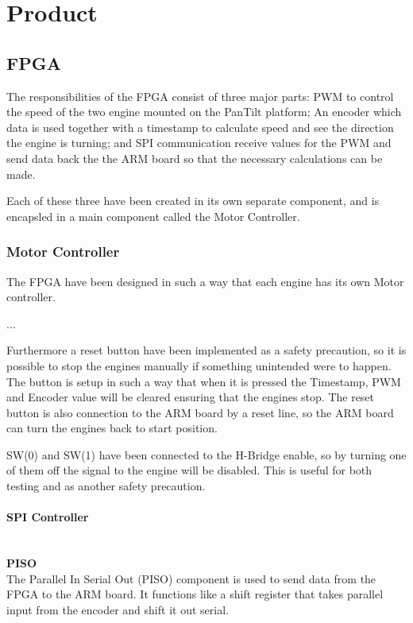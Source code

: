 \section{Product}

\subsection{FPGA}
The responsibilities of the FPGA consist of three major parts: PWM to control the speed of the two engine mounted on the PanTilt platform; An encoder which data is used together with a timestamp to calculate speed and see the direction the engine is turning; and SPI communication receive values for the PWM and send data back the the ARM board so that the necessary calculations can be made.

Each of these three have been created in its own separate component, and is encapsled in a main component called the Motor Controller.


\subsubsection{Motor Controller}

The FPGA have been designed in such a way that each engine has its own Motor controller.

...

Furthermore a reset button have been implemented as a safety precaution, so it is possible to stop the engines manually if something unintended were to happen. The button is setup in such a way that when it is pressed the Timestamp, PWM and Encoder value will be cleared ensuring that the engines stop. The reset button is also connection to the ARM board by a reset line, so the ARM board can turn the engines back to start position.

SW(0) and SW(1) have been connected to the H-Bridge enable, so by turning one of them off the signal to the engine will be disabled. This is useful for both testing and as another safety precaution.

\paragraph{SPI Controller}\mbox{}\\

\textbf{PISO}\\
The Parallel In Serial Out (PISO) component is used to send data from the FPGA to the ARM board. It functions like a shift register that takes parallel input from the encoder and shift it out serial.

